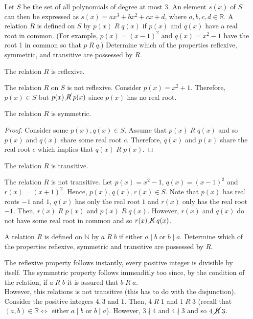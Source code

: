 \documentclass[12pt]{article}
\newcommand{\N}{\mathbb{N}}
\newcommand{\R}{\mathbb{R}}
\newenvironment{problem}[2][Problem]{\begin{trivlist}
		\item[\hskip \labelsep {\bfseries #1}\hskip \labelsep {\bfseries #2.}]}{\end{trivlist}}
\newenvironment{solution}[2][Solution]{\begin{trivlist}
		\item[\hskip \labelsep {\bfseries #1}\hskip \labelsep {\bfseries #2.}]}{\end{trivlist}}
\begin{document}
 	\begin{problem}{22}
 		Let $S$ be the set of all polynomials of degree at most 3. An element $s(x)$ of $S$ can then be expressed as $s(x) = ax^{3} + bx^{2} +cx +d$, where $a,b,c,d\in \R$. A relation $R$ is defined on $S$ by $p(x) \; R \; q(x)$ if $p(x)$ and $q(x)$ have a real root in common. (For example, $p(x) = (x-1)^{2}$ and $q(x) = x^{2}-1$ have the root 1 in common so that $p \; R \; q$.) Determine which of the properties reflexive, symmetric, and transitive are possessed by $R$.
 		\begin{enumerate}
 			\item The relation $R$ is reflexive.
 			\begin{solution}{(a)}
 				The relation $R$ on $S$ is not reflexive. Consider $p(x) = x^{2}+1$. Therefore, $p(x)\in S$ but $p(x) \; \cancel R \; p(x)$ since $p(x)$ has no real root.
 			\end{solution}
 			\item The relation $R$ is symmetric.
 			\begin{proof}
 				Consider some $p(x),q(x)\in S$. Assume that $p(x) \; R \; q(x)$ and so $p(x)$ and $q(x)$ share some real root $c$. Therefore, $q(x)$ and $p(x)$ share the real root $c$ which implies that $q(x)\; R \; p(x)$.
 			\end{proof}
 			\item The relation $R$ is transitive.
 			\begin{solution}{(c)}
 				The relation $R$ is not transitive.
 				Let $p(x)=x^{2}-1$, $q(x)=(x-1)^{2}$ and $r(x) = (x+1)^{2}$. Hence, $p(x),q(x),r(x)\in S$. Note that $p(x)$ has real roots $-1$ and $1$, $q(x)$ has only the real root $1$ and $r(x)$ only has the real root $-1$. Then, $r(x) \; R \; p(x)$ and $p(x) \; R \; q(x)$. However, $r(x)$ and $q(x)$ do not have some real root in common and so $r(x)\; \cancel R \; q(x)$.
 			\end{solution}
 		\end{enumerate}
 	\end{problem}
 
 	\begin{problem}{23}
 		A relation $R$ is defined on $\N$ by $a\; R \; b$ if either $a\mid b$ or $b\mid a$. Determine which of the properties reflexive, symmetric and transitive are possessed by $R$.
 		\begin{solution}{23}
 			The reflexive property follows instantly, every positive integer is divisible by itself. The symmetric property follows immeaditly too since, by the condition of the relation, if $a\; R \;b$ it is assured that $b\; R \;a$.\\
 			However, this relations is not transitive (this has to do with the disjunction). Consider the positive integers $4,3$ and $1$. Then, $4\; R \; 1$ and $1\; R\; 3$ (recall that $(a,b)\in \R \iff$ either $a\mid b$ or $b\mid a$). However, $3\nmid 4$ and $4\nmid 3$ and so $4\; \cancel R \;3$. 
 		\end{solution}
 	\end{problem}
\end{document}
